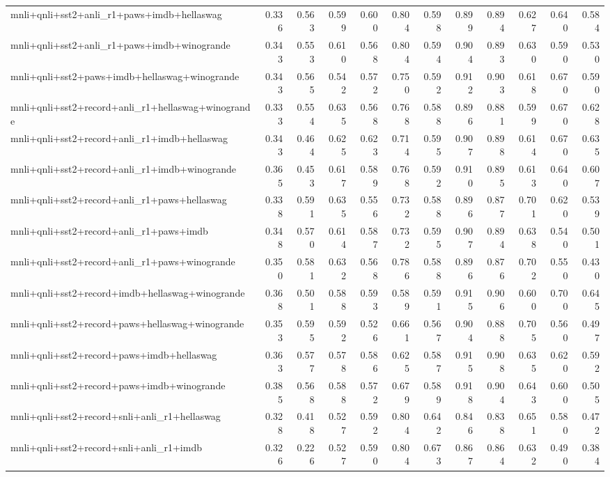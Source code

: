 \begin{table}[t]
\begin{tabular}{lrrrrrrrrrrr}
    mnli+qnli+sst2+anli\_r1+paws+imdb+hellaswag & 0.336 & 0.563 & 0.599 & 0.600 & 0.804 & 0.598 & 0.899 & 0.894 & 0.627 & 0.640 & 0.584 \\
    mnli+qnli+sst2+anli\_r1+paws+imdb+winogrande & 0.343 & 0.553 & 0.610 & 0.568 & 0.804 & 0.594 & 0.904 & 0.893 & 0.630 & 0.590 & 0.530 \\
    mnli+qnli+sst2+paws+imdb+hellaswag+winogrande & 0.343 & 0.565 & 0.542 & 0.572 & 0.750 & 0.592 & 0.912 & 0.903 & 0.618 & 0.670 & 0.590 \\
    mnli+qnli+sst2+record+anli\_r1+hellaswag+winogrande & 0.333 & 0.554 & 0.635 & 0.568 & 0.768 & 0.588 & 0.896 & 0.881 & 0.599 & 0.670 & 0.628 \\
    mnli+qnli+sst2+record+anli\_r1+imdb+hellaswag & 0.343 & 0.464 & 0.625 & 0.623 & 0.714 & 0.595 & 0.907 & 0.898 & 0.614 & 0.670 & 0.635 \\
    mnli+qnli+sst2+record+anli\_r1+imdb+winogrande & 0.365 & 0.453 & 0.617 & 0.589 & 0.768 & 0.592 & 0.910 & 0.895 & 0.613 & 0.640 & 0.607 \\
    mnli+qnli+sst2+record+anli\_r1+paws+hellaswag & 0.338 & 0.591 & 0.635 & 0.556 & 0.732 & 0.588 & 0.896 & 0.877 & 0.701 & 0.620 & 0.539 \\
    mnli+qnli+sst2+record+anli\_r1+paws+imdb & 0.348 & 0.570 & 0.614 & 0.587 & 0.732 & 0.595 & 0.907 & 0.894 & 0.638 & 0.540 & 0.501 \\
    mnli+qnli+sst2+record+anli\_r1+paws+winogrande & 0.350 & 0.581 & 0.632 & 0.568 & 0.786 & 0.588 & 0.896 & 0.876 & 0.702 & 0.550 & 0.430 \\
    mnli+qnli+sst2+record+imdb+hellaswag+winogrande & 0.368 & 0.501 & 0.588 & 0.593 & 0.589 & 0.591 & 0.915 & 0.906 & 0.600 & 0.700 & 0.645 \\
    mnli+qnli+sst2+record+paws+hellaswag+winogrande & 0.353 & 0.595 & 0.592 & 0.526 & 0.661 & 0.567 & 0.904 & 0.888 & 0.705 & 0.560 & 0.497 \\
    mnli+qnli+sst2+record+paws+imdb+hellaswag & 0.363 & 0.577 & 0.578 & 0.586 & 0.625 & 0.587 & 0.915 & 0.908 & 0.635 & 0.620 & 0.592 \\
    mnli+qnli+sst2+record+paws+imdb+winogrande & 0.385 & 0.568 & 0.588 & 0.572 & 0.679 & 0.589 & 0.918 & 0.904 & 0.643 & 0.600 & 0.505 \\
    mnli+qnli+sst2+record+snli+anli\_r1+hellaswag & 0.328 & 0.418 & 0.527 & 0.592 & 0.804 & 0.642 & 0.846 & 0.838 & 0.651 & 0.580 & 0.472 \\
    mnli+qnli+sst2+record+snli+anli\_r1+imdb & 0.326 & 0.226 & 0.527 & 0.590 & 0.804 & 0.673 & 0.867 & 0.864 & 0.632 & 0.490 & 0.384 \\

\end{tabular}
\end{table}
